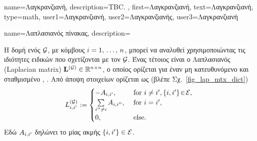 {name={\foreignlanguage{greek}{Λαγκρανζιανή}},
	description={TBC. },
	first={\foreignlanguage{greek}{Λαγκρανζιανή}},
	text={\foreignlanguage{greek}{Λαγκρανζιανή}},
	type=math,
	user1={\foreignlanguage{greek}{Λαγκρανζιανή}}, %
	user2={\foreignlanguage{greek}{Λαγκρανζιανής}}, %
	user3={\foreignlanguage{greek}{Λαγκρανζιανή}} %
}

{name={\foreignlanguage{greek}{Λαπλασιανός πίνακας}},
	description={\foreignlanguage{greek}{Η δομή ενός}  $\mathcal{G}$,  
		\foreignlanguage{greek}{με κόμβους $i=1, \,\ldots, \,n$, μπορεί να αναλυθεί χρησιμοποιώντας τις ιδιότητες ειδικών}   
		 \foreignlanguage{greek}{που σχετίζονται με τον $\mathcal{G}$. Ένας τέτοιος}  
		\foreignlanguage{greek}{είναι ο Λαπλασιανός}  (Laplacian matrix)  
		${\bf L}^{(\mathcal{G})} \in \mathbb{R}^{n \times n}$, \foreignlanguage{greek}{ο οποίος ορίζεται για έναν μη κατευθυνόμενο και 
		σταθμισμένο}  \cite{Luxburg2007}, \cite{Ng2001}. 
		\foreignlanguage{greek}{Από άποψη στοιχείων ορίζεται ως (βλέπε Σχ.}\ \ref{fig_lap_mtx_dict})
		\begin{equation}
			\nonumber
			L^{(\mathcal{G})}_{i,i'} := \begin{cases} - A_{i,i'}, & \mbox{ for } i\neq i', \{i,i'\}\!\in\!\mathcal{E}, \\ 
			\sum\limits_{i'' \neq i} A_{i,i''}, & \mbox{ for } i = i', \\ 
							0, & \mbox{ else.} \end{cases}
	 	\end{equation}
  		\foreignlanguage{greek}{Εδώ $A_{i,i'}$ δηλώνει το}  \foreignlanguage{greek}{μίας 
		ακμής} $\{i,i'\} \in \mathcal{E}$. 
 	 	\begin{figure}[H]
  		\begin{center}
    		\begin{minipage}{0.45\textwidth}
\end{minipage}
\end{center}
\end{figure}}}
